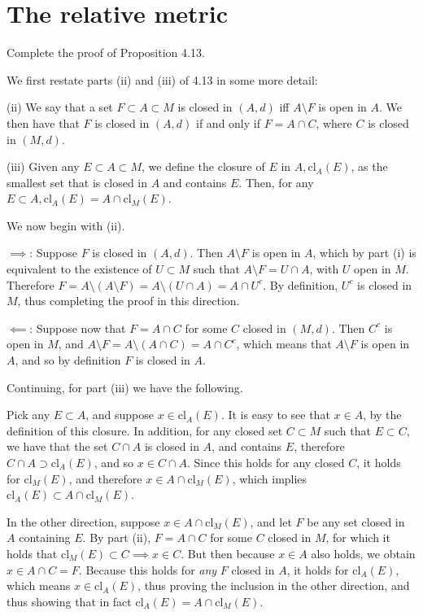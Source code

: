 \section{The relative metric}

\begin{exercise}{1}
    Complete the proof of Proposition 4.13.
\end{exercise}

\begin{solution}
    
    We first restate parts (ii) and (iii) of 4.13 in some more detail:

    (ii) We say that a set $F \subset A \subset M$ is closed in $(A, d)$ iff $A \setminus F$ is open in $A$.
    We then have that $F$ is closed in $(A, d)$ if and only if $F = A \cap C$, where $C$ is closed in $(M, d)$.

    (iii) Given any $E \subset A \subset M$, we define the closure of $E$ in $A, \text{cl}_{A}(E)$, as the smallest set that is closed in $A$ and contains $E$.
    Then, for any $E \subset A, \text{cl}_{A}(E) = A \cap \text{cl}_{M}(E)$.

    We now begin with (ii).

    $\implies$: Suppose $F$ is closed in $(A, d)$.
    Then $A \setminus F$ is open in $A$, which by part (i) is equivalent to the existence of $U \subset M$ such that $A \setminus F = U \cap A$, with $U$ open in $M$.
    Therefore $F = A \setminus (A \setminus F) = A \setminus (U \cap A) = A \cap U^c$.
    By definition, $U^c$ is closed in $M$, thus completing the proof in this direction.

    $\impliedby$: Suppose now that $F = A \cap C$ for some $C$ closed in $(M, d)$.
    Then $C^c$ is open in $M$, and $A \setminus F = A \setminus (A \cap C) = A \cap C^c$, which means that $A \setminus F$ is open in $A$, and so by definition $F$ is closed in $A$.

    Continuing, for part (iii) we have the following.

    Pick any $E \subset A$, and suppose $x \in \text{cl}_A(E)$.
    It is easy to see that $x \in A$, by the definition of this closure.
    In addition, for any closed set $C \subset M$ such that $E \subset C$, we have that the set $C \cap A$ is closed in $A$, and contains $E$, therefore $C \cap A \supset \text{cl}_A(E)$, and so $x \in C \cap A$.
    Since this holds for any closed $C$, it holds for $\text{cl}_{M}(E)$, and therefore $x \in A \cap \text{cl}_M(E)$, which implies $\text{cl}_A(E) \subset A \cap \text{cl}_M(E)$.
    
    In the other direction, suppose $x \in A \cap \text{cl}_M(E)$, and let $F$ be any set closed in $A$ containing $E$.
    By part (ii), $F = A \cap C$ for some $C$ closed in $M$, for which it holds that $\text{cl}_M(E) \subset C \implies x \in C$.
    But then because $x \in A$ also holds, we obtain $x \in A \cap C = F$.
    Because this holds for \textit{any} $F$ closed in $A$, it holds for $\text{cl}_A(E)$, which means $x \in \text{cl}_A(E)$, thus proving the inclusion in the other direction, and thus showing that in fact $\text{cl}_A(E) = A \cap \text{cl}_M(E)$.
\end{solution}

